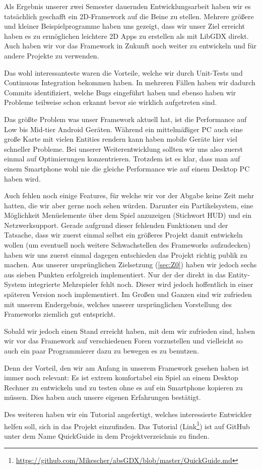Als Ergebnis unserer zwei Semester dauernden Entwicklungsarbeit haben wir es tatsächlich geschafft ein 2D-Framework auf die Beine zu stellen.
Mehrere größere und kleiner Beispielprogramme haben uns gezeigt, dass wir unser Ziel erreicht haben es zu ermöglichen leichtere 2D Apps zu erstellen als mit LibGDX direkt.
Auch haben wir vor das Framework in Zukunft noch weiter zu entwickeln und für andere Projekte zu verwenden.

Das wohl interessanteste waren die Vorteile, welche wir durch Unit-Tests und Continuous Integration bekommen haben. In mehreren Fällen haben wir dadurch Commits identifiziert, welche Bugs eingeführt haben und ebenso haben wir Probleme teilweise schon erkannt bevor sie wirklich aufgetreten sind.

Das größte Problem was unser Framework aktuell hat, ist die Performance auf Low bis Mid-tier Android Geräten. Während ein mittelmäßiger PC auch eine große Karte mit vielen Entities rendern kann haben mobile Geräte hier viel schneller Probleme. Bei unserer Weiterentwicklung sollten wir uns also zuerst einmal auf Optimierungen konzentrieren. Trotzdem ist es klar, dass man auf einem Smartphone wohl nie die gleiche Performance wie auf einem Desktop PC haben wird.

Auch fehlen noch einige Features, für welche wir vor der Abgabe keine Zeit mehr hatten, die wir aber gerne noch sehen würden. Darunter ein Partikelsystem, eine Möglichkeit Menüelemente über dem Spiel anzuzeigen (Stichwort HUD) und ein Netzwerksupport. Gerade aufgrund dieser fehlenden Funktionen und der Tatsache, dass wir zuerst einmal selbst ein größeres Projekt damit entwickeln wollen (um eventuell noch weitere Schwachstellen des Frameworks aufzudecken) haben wir uns zuerst einmal dagegen entschieden das Projekt richtig publik zu machen. 
Aus unserer ursprünglichen Zielsetzung (\ref{sec:Z0}) haben wir jedoch sechs aus sieben Punkten erfolgreich implementiert. Nur der der direkt in das Entity-System integrierte Mehrspieler fehlt noch. Dieser wird jedoch hoffentlich in einer späteren Version noch implementiert. Im Großen und Ganzen sind wir zufrieden mit unserem Endergebnis, welches unserer ursprünglichen Vorstellung des Frameworks ziemlich gut entspricht.

Sobald wir jedoch einen Stand erreicht haben, mit dem wir zufrieden sind, haben wir vor das Framework auf verschiedenen Foren vorzustellen und vielleicht so auch ein paar Programmierer dazu zu bewegen es zu benutzen.

Denn der Vorteil, den wir am Anfang in unserem Framework gesehen haben ist immer noch relevant: Es ist extrem komfortabel ein Spiel an einem Desktop Rechner zu entwickeln und zu testen ohne es auf ein Smartphone kopieren zu müssen. Dies haben auch unsere eigenen Erfahrungen bestätigt. 

Des weiteren haben wir ein Tutorial angefertigt, welches interessierte Entwickler helfen soll, sich in das Projekt einzufinden. Das Tutorial (Link\footnote{\url{https://github.com/Mikescher/absGDX/blob/master/QuickGuide.md}}) ist auf GitHub unter dem Name QuickGuide in dem Projektverzeichnis zu finden. 
